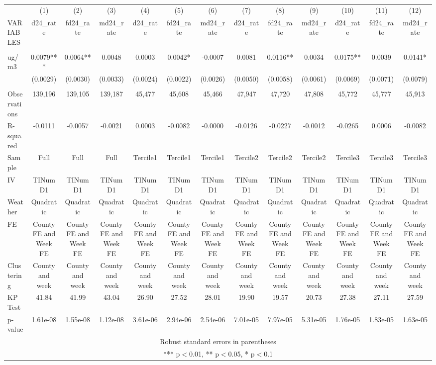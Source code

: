 \begin{tabular}{lcccccccccccc} \hline
 & (1) & (2) & (3) & (4) & (5) & (6) & (7) & (8) & (9) & (10) & (11) & (12) \\
VARIABLES & d24\_rate & fd24\_rate & md24\_rate & d24\_rate & fd24\_rate & md24\_rate & d24\_rate & fd24\_rate & md24\_rate & d24\_rate & fd24\_rate & md24\_rate \\ \hline
 &  &  &  &  &  &  &  &  &  &  &  &  \\
ug/m3 & 0.0079*** & 0.0064** & 0.0048 & 0.0003 & 0.0042* & -0.0007 & 0.0081 & 0.0116** & 0.0034 & 0.0175** & 0.0039 & 0.0141* \\
 & (0.0029) & (0.0030) & (0.0033) & (0.0024) & (0.0022) & (0.0026) & (0.0050) & (0.0058) & (0.0061) & (0.0069) & (0.0071) & (0.0079) \\
 &  &  &  &  &  &  &  &  &  &  &  &  \\
Observations & 139,196 & 139,105 & 139,187 & 45,477 & 45,608 & 45,466 & 47,947 & 47,720 & 47,808 & 45,772 & 45,777 & 45,913 \\
R-squared & -0.0111 & -0.0057 & -0.0021 & 0.0003 & -0.0082 & -0.0000 & -0.0126 & -0.0227 & -0.0012 & -0.0265 & 0.0006 & -0.0082 \\
Sample & Full & Full & Full & Tercile1 & Tercile1 & Tercile1 & Tercile2 & Tercile2 & Tercile2 & Tercile3 & Tercile3 & Tercile3 \\
IV & TINumD1 & TINumD1 & TINumD1 & TINumD1 & TINumD1 & TINumD1 & TINumD1 & TINumD1 & TINumD1 & TINumD1 & TINumD1 & TINumD1 \\
Weather & Quadratic & Quadratic & Quadratic & Quadratic & Quadratic & Quadratic & Quadratic & Quadratic & Quadratic & Quadratic & Quadratic & Quadratic \\
FE & County FE and Week FE & County FE and Week FE & County FE and Week FE & County FE and Week FE & County FE and Week FE & County FE and Week FE & County FE and Week FE & County FE and Week FE & County FE and Week FE & County FE and Week FE & County FE and Week FE & County FE and Week FE \\
Clustering & County and week & County and week & County and week & County and week & County and week & County and week & County and week & County and week & County and week & County and week & County and week & County and week \\
KP Test & 41.84 & 41.99 & 43.04 & 26.90 & 27.52 & 28.01 & 19.90 & 19.57 & 20.73 & 27.38 & 27.11 & 27.59 \\
 p-value & 1.61e-08 & 1.55e-08 & 1.12e-08 & 3.61e-06 & 2.94e-06 & 2.54e-06 & 7.01e-05 & 7.97e-05 & 5.31e-05 & 1.76e-05 & 1.83e-05 & 1.63e-05 \\ \hline
\multicolumn{13}{c}{ Robust standard errors in parentheses} \\
\multicolumn{13}{c}{ *** p$<$0.01, ** p$<$0.05, * p$<$0.1} \\
\end{tabular}
